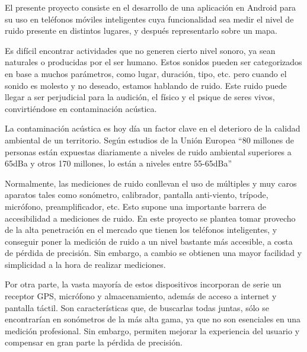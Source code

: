 
\minitoc

\label{sec:intro:obj}
    El presente proyecto consiste en el desarrollo de una aplicación en Android para su uso en teléfonos móviles inteligentes cuya funcionalidad sea medir el nivel de ruido presente en distintos lugares, y después representarlo sobre un mapa.

    Es difícil encontrar actividades que no generen cierto nivel sonoro, ya sean naturales o producidas por el ser humano. Estos sonidos pueden ser categorizados en base a muchos parámetros, como lugar, duración, tipo, etc. pero cuando el sonido es molesto y no deseado, estamos hablando de ruido. Este ruido puede llegar a ser perjudicial para la audición, el físico y el psique de seres vivos, convirtiéndose en contaminación acústica.
    
    La contaminación acústica es hoy día un factor clave en el deterioro de la calidad ambiental de un territorio. Según estudios de la Unión Europea “80 millones de personas están expuestas diariamente a niveles de ruido ambiental superiores a 65dBa y otros 170 millones, lo están a niveles entre 55-65dBa” \cite{directiva}
    
    Normalmente, las mediciones de ruido conllevan el uso de múltiples y muy caros aparatos tales como sonómetro, calibrador, pantalla anti-viento, trípode, micrófono, preamplificador, etc. Esto supone una importante barrera de accesibilidad a mediciones de ruido. En este proyecto se plantea tomar provecho de la alta penetración en el mercado que tienen los teléfonos inteligentes, y conseguir poner la medición de ruido a un nivel bastante más accesible, a costa de pérdida de precisión. Sin embargo, a cambio se obtienen una mayor facilidad y simplicidad a la hora de realizar mediciones.
    
    Por otra parte, la vasta mayoría de estos dispositivos incorporan de serie un receptor GPS, micrófono y almacenamiento, además de acceso a internet y pantalla táctil. Son características que, de buscarlas todas juntas, sólo se encontrarían en sonómetros de la más alta gama, ya que no son esenciales en una medición profesional. Sin embargo, permiten mejorar la experiencia del usuario y compensar en gran parte la pérdida de precisión.\

